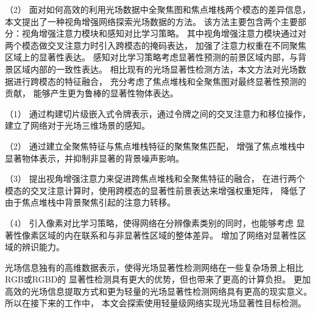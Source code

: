 %
%
（2）
%
%
面对如何高效的利用光场数据中全聚焦图和焦点堆栈两个模态的差异信息，
本文提出了一种视角增强网络探索光场数据的方法。
%
%
该方法主要包含两个主要部分：视角增强注意力模块和感知对比学习策略。
%
%
其中视角增强注意力模块通过对两个模态做交叉注意力时引入跨模态的掩码表达，
加强了注意力权重在不同聚焦区域上的显著性表达。
%
%
感知对比学习策略考虑显著性预测的前景区域内部，与背景区域内部的一致性表达。
%
%
相比现有的光场显著性检测方法，本文方法对光场数据进行跨模态的特征融合，
充分考虑了焦点堆栈和全聚焦图对最终显著性预测的贡献，
能够产生更为鲁棒的显著性物体表达。




%
%
%
%


（1）
通过构建切片级嵌入式令牌表示，通过令牌之间的交叉注意力和移位操作，
建立了网络对于光场三维场景的感知。


（2）
通过建立全聚焦特征与焦点堆栈特征的聚焦聚焦匹配，
增强了焦点堆栈中显著物体表示，并抑制非显著的背景噪声影响。


（3）
提出视角增强注意力来促进跨焦点堆栈和全聚焦特征的融合，
在进行两个模态的交叉注意计算时，使用跨模态的显著性前景表达来增强权重矩阵，
降低了由于焦点堆栈中背景聚焦引起的注意力转移。


（4）
引入像素对比学习策略，使得网络在分辨像素类别的同时，也能够考虑
显著性像素区域的内在联系和与非显著性区域的整体差异。
增加了网络对显著性区域的辨识能力。



%
%
%

光场信息独有的高维数据表示，使得光场显著性检测网络在一些复杂场景上相比RGB或RGBD的
显著性检测具有更大的优势，但也带来了更高的计算负担。
更加高效的光场信息提取方式和更为轻量的光场显著性检测网络具有更高的现实意义。
所以在接下来的工作中，
本文会探索使用轻量级网络实现光场显著性目标检测。



















